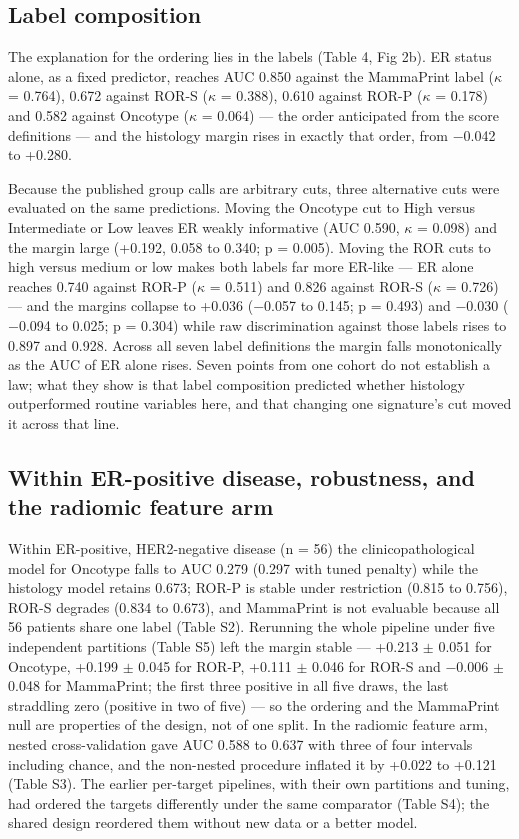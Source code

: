 \documentclass[11pt,a4paper]{article}
\begin{document}
\subsection{Label composition}
The explanation for the ordering lies in the labels (Table 4, Fig 2b). ER status alone, as a fixed predictor, reaches AUC 0.850 against the MammaPrint label ($\kappa$ = 0.764), 0.672 against ROR-S ($\kappa$ = 0.388), 0.610 against ROR-P ($\kappa$ = 0.178) and 0.582 against Oncotype ($\kappa$ = 0.064) --- the order anticipated from the score definitions --- and the histology margin rises in exactly that order, from $-$0.042 to +0.280.

Because the published group calls are arbitrary cuts, three alternative cuts were evaluated on the same predictions. Moving the Oncotype cut to High versus Intermediate or Low leaves ER weakly informative (AUC 0.590, $\kappa$ = 0.098) and the margin large (+0.192, 0.058 to 0.340; p = 0.005). Moving the ROR cuts to high versus medium or low makes both labels far more ER-like --- ER alone reaches 0.740 against ROR-P ($\kappa$ = 0.511) and 0.826 against ROR-S ($\kappa$ = 0.726) --- and the margins collapse to +0.036 ($-$0.057 to 0.145; p = 0.493) and $-$0.030 ($-$0.094 to 0.025; p = 0.304) while raw discrimination against those labels rises to 0.897 and 0.928. Across all seven label definitions the margin falls monotonically as the AUC of ER alone rises. Seven points from one cohort do not establish a law; what they show is that label composition predicted whether histology outperformed routine variables here, and that changing one signature's cut moved it across that line.

\subsection{Within ER-positive disease, robustness, and the radiomic feature arm}
Within ER-positive, HER2-negative disease (n = 56) the clinicopathological model for Oncotype falls to AUC 0.279 (0.297 with tuned penalty) while the histology model retains 0.673; ROR-P is stable under restriction (0.815 to 0.756), ROR-S degrades (0.834 to 0.673), and MammaPrint is not evaluable because all 56 patients share one label (Table S2). Rerunning the whole pipeline under five independent partitions (Table S5) left the margin stable --- +0.213 $\pm$ 0.051 for Oncotype, +0.199 $\pm$ 0.045 for ROR-P, +0.111 $\pm$ 0.046 for ROR-S and $-$0.006 $\pm$ 0.048 for MammaPrint; the first three positive in all five draws, the last straddling zero (positive in two of five) --- so the ordering and the MammaPrint null are properties of the design, not of one split. In the radiomic feature arm, nested cross-validation gave AUC 0.588 to 0.637 with three of four intervals including chance, and the non-nested procedure inflated it by +0.022 to +0.121 (Table S3). The earlier per-target pipelines, with their own partitions and tuning, had ordered the targets differently under the same comparator (Table S4); the shared design reordered them without new data or a better model.
\end{document}
